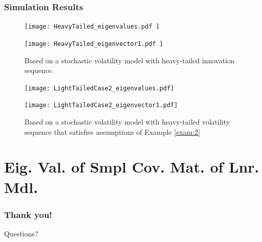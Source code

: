 \documentclass{beamer}
\begin{document}
\begin{frame}
  \frametitle{Simulation Results}
\begin{figure}[htb]
  \centering
  \begin{minipage}{0.48\linewidth}
    \texttt{[image: 
      HeavyTailed\_eigenvalues.pdf
    ]}
  \end{minipage}
  \begin{minipage}{0.48\linewidth}
    \texttt{[image: 
      HeavyTailed\_eigenvector1.pdf
    ]}
  \end{minipage}
  \caption{Based on a stochastic volatility model with heavy-tailed
    innovation sequence.}
  \label{eigen:model1}
\end{figure}

\begin{figure}[htb]
  \centering
  \begin{minipage}{0.48\linewidth}
    \texttt{[image: LightTailedCase2\_eigenvalues.pdf]}
  \end{minipage}
  \begin{minipage}{0.48\linewidth}
    \texttt{[image: LightTailedCase2\_eigenvector1.pdf]}
  \end{minipage}
  \caption{Based on a stochastic volatility model with heavy-tailed
    volatility sequence that satisfies assumptions of Example
    \ref{exam:2}}
  \label{eigen:model3}
\end{figure}
\end{frame}


\section{Eig. Val. of Smpl Cov. Mat. of Lnr. Mdl.}

\begin{frame}
   \frametitle{Thank you!}
   Questions?
 \end{frame}


\end{document}
